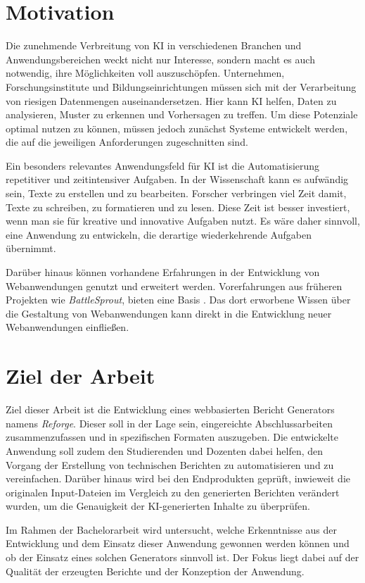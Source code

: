 \section{Motivation}
Die zunehmende Verbreitung von \ac{KI} in verschiedenen Branchen und Anwendungsbereichen weckt nicht nur Interesse, sondern macht es auch notwendig, ihre Möglichkeiten voll auszuschöpfen. Unternehmen, Forschungsinstitute und Bildungseinrichtungen müssen sich mit der Verarbeitung von riesigen Datenmengen auseinandersetzen. Hier kann \ac{KI} helfen, Daten zu analysieren, Muster zu erkennen und Vorhersagen zu treffen. Um diese Potenziale optimal nutzen zu können, müssen jedoch zunächst Systeme entwickelt werden, die auf die jeweiligen Anforderungen zugeschnitten sind.

Ein besonders relevantes Anwendungsfeld für \ac{KI} ist die Automatisierung repetitiver und zeitintensiver Aufgaben. In der Wissenschaft kann es aufwändig sein, Texte zu erstellen und zu bearbeiten. Forscher verbringen viel Zeit damit, Texte zu schreiben, zu formatieren und zu lesen. Diese Zeit ist besser investiert, wenn man sie für kreative und innovative Aufgaben nutzt. Es wäre daher sinnvoll, eine Anwendung zu entwickeln, die derartige wiederkehrende Aufgaben übernimmt.

Darüber hinaus können vorhandene Erfahrungen in der Entwicklung von Webanwendungen genutzt und erweitert werden. Vorerfahrungen aus früheren Projekten wie \textit{BattleSprout}, bieten eine Basis \cite{battlesprout}. Das dort erworbene Wissen über die Gestaltung von Webanwendungen kann direkt in die Entwicklung neuer Webanwendungen einfließen.

\section{Ziel der Arbeit}
Ziel dieser Arbeit ist die Entwicklung eines webbasierten Bericht Generators namens \textit{Reforge}. Dieser soll in der Lage sein, eingereichte Abschlussarbeiten zusammenzufassen und in spezifischen Formaten auszugeben. Die entwickelte Anwendung soll zudem den Studierenden und Dozenten dabei helfen, den Vorgang der Erstellung von technischen Berichten zu automatisieren und zu vereinfachen. Darüber hinaus wird bei den Endprodukten geprüft, inwieweit die originalen Input-Dateien im Vergleich zu den generierten Berichten verändert wurden, um die Genauigkeit der \ac{KI}-generierten Inhalte zu überprüfen.

Im Rahmen der Bachelorarbeit wird untersucht, welche Erkenntnisse aus der Entwicklung und dem Einsatz dieser Anwendung gewonnen werden können und ob der Einsatz eines solchen Generators sinnvoll ist. Der Fokus liegt dabei auf der Qualität der erzeugten Berichte und der Konzeption der Anwendung.

